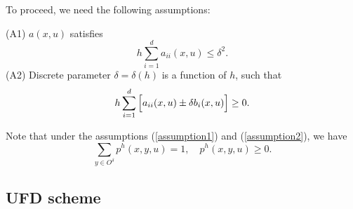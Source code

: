 \documentclass{article}
\begin{document}
To proceed, we need the following assumptions:

(A1) $a(x, u)$ satisfies
\begin{equation} \label{assumption1}
    h \sum_{i = 1}^{d} a_{ii}(x, u) \leq \delta^{2}.
\end{equation}
(A2) Discrete parameter $\delta = \delta(h)$ is a function of $h$, such that
\begin{equation} \label{assumption2}
    h \sum_{i = 1}^{d} \Big{[} a_{ii} (x, u) \pm \delta b_{i}(x, u) \Big{]} \geq 0.
\end{equation}

Note that under the assumptions (\ref{assumption1}) and (\ref{assumption2}), we have
\begin{equation*}
    \sum_{y \in O^{\delta}} p^{h} (x, y, u) = 1, \quad p^{h}(x, y, u) \geq 0.
\end{equation*}

\subsection{UFD scheme}
\end{document}
